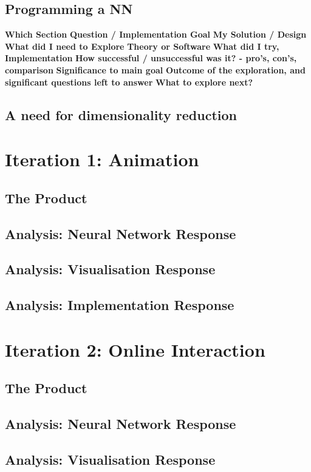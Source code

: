\documentclass[a4paper,11pt,titlepage]{article}
\begin{document}
	\subsection{Programming a NN}
	\textbf{Which Section}
	\textbf{Question / Implementation Goal}
	\textbf{My Solution / Design}
	\textbf{What did I need to Explore}
	\textbf{Theory or Software}
	\textbf{What did I try, Implementation}
	\textbf{How successful / unsuccessful was it? - pro's, con's, comparison}
	\textbf{Significance to main goal}
	\textbf{Outcome of the exploration, and significant questions left to answer}
	\textbf{What to explore next?}
	\subsection{A need for dimensionality reduction}

\section{Iteration 1: Animation}
	\subsection{The Product}
	\subsection{Analysis: Neural Network Response}
	\subsection{Analysis: Visualisation Response}
	\subsection{Analysis: Implementation Response}
	
\section{Iteration 2: Online Interaction}
	\subsection{The Product}	
	\subsection{Analysis: Neural Network Response}
	\subsection{Analysis: Visualisation Response}
	
\end{document}
